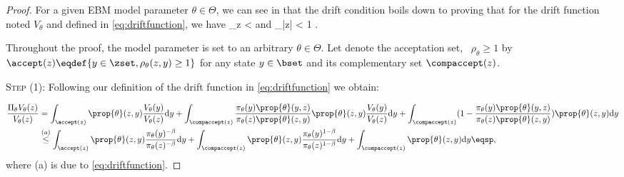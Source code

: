 \documentclass[10pt,twocolumn,letterpaper]{article}
\begin{document}
\begin{proof}
For a given EBM model parameter $\theta \in \Theta$, we can see in \cite{jarner2000geometric} that the drift condition boils down to proving that for the drift function noted $V_\theta$ and defined in \eqref{eq:driftfunction}, we have
\beq\label{mainproof}
\sup \limits_{z \in \zset}   < \infty \quad \textrm{and} \quad \lim \sup \limits_{|z| \to \infty}   < 1 \eqsp.
\eeq

Throughout the proof, the model parameter is set to an arbitrary $\theta \in \Theta$.
Let denote the acceptation set, \ie\ $\rho_\theta \geq 1$ by $\accept(z) \eqdef \{ y \in \zset, \rho_\theta(z,y) \geq 1 \}$ for any state $y \in \bset$ and its complementary set $\compaccept(z)$.

\medskip
\noindent \textsc{Step (1): } Following our definition of the drift function in \eqref{eq:driftfunction} we obtain:

\begin{align}\label{eq:main1}
 \frac{\Pi_\theta V_\theta(z)}{V_\theta(z)} & = \int_{\accept(z)}  \prop{\theta}(z,y) \frac{V_\theta(y)}{V_\theta(z)} \textrm{d}y +  \int_{\compaccept(z)} \frac{\pi_\theta(y)\prop{\theta}(y,z)}{\pi_\theta(z)\prop{\theta}(z,y)} \prop{\theta}(z,y) \frac{V_\theta(y)}{V_\theta(z)} \textrm{d}y +  \int_{\compaccept(z)} (1 - \frac{\pi_\theta(y)\prop{\theta}(y,z)}{\pi_\theta(z)\prop{\theta}(z,y)}) \prop{\theta}(z,y)  \textrm{d}y\\
 &  \overset{(a)}{\leq} \int_{\accept(z)}  \prop{\theta}(z,y) \frac{\pi_\theta(y)^{-\beta}}{\pi_\theta(z)^{-\beta}} \textrm{d}y  + \int_{\compaccept(z)} \prop{\theta}(z,y) \frac{\pi_\theta(y)^{1-\beta}}{\pi_\theta(z)^{1-\beta}}\textrm{d}y +  \int_{\compaccept(z)} \prop{\theta}(z,y)  \textrm{d}y \eqsp,
\end{align}
where (a) is due to \eqref{eq:driftfunction}.


\end{proof}
\end{document}
